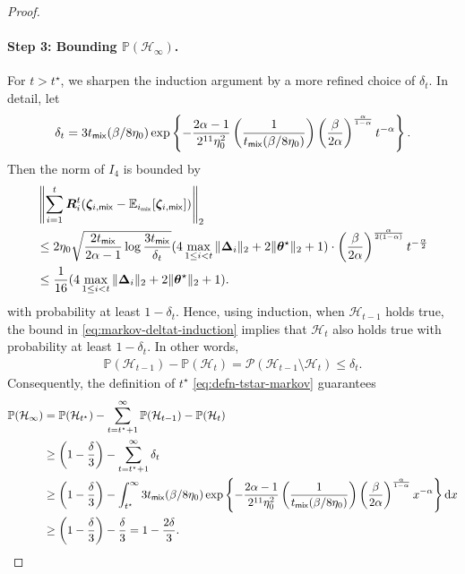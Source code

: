 \begin{proof}
\paragraph{Step 3: Bounding $\mathbb{P}(\mathcal{H}_{\infty})$.} For $t > t^\star$, we sharpen the induction argument by a more refined choice of $\delta_t$. In detail, let 
\begin{align*}
\delta_t = 3t_{\mathsf{mix}}(\beta/8\eta_0)\exp\left\{-\frac{2\alpha-1}{2^{11} \eta_0^2} \left(\frac{1}{t_{\mathsf{mix}}(\beta/8\eta_0)}\right)\left(\frac{\beta}{2\alpha}\right)^{\frac{\alpha}{1-\alpha}} t^{-\alpha}\right\}.
\end{align*}
Then the norm of $I_4$ is bounded by
\begin{align*}
&\left\|\sum_{i=1}^t \bm{R}_i^t (\bm{\zeta}_{i,\mathsf{mix}} - \mathbb{E}_{i_{\mathsf{mix}}}[\bm{\zeta}_{i,\mathsf{mix}}])\right\|_2\\ 
&\leq 2 \eta_0 \sqrt{\frac{2t_{\mathsf{mix}}}{2\alpha-1}\log \frac{3t_{\mathsf{mix}}}{\delta_t}}(4\max_{1 \leq i < t} \|\bm{\Delta}_i\|_2 + 2\|\bm{\theta}^\star\|_2  + 1)\cdot \left(\frac{\beta}{2\alpha}\right)^{\frac{\alpha}{2(1-\alpha)}}t^{-\frac{\alpha}{2}} \\ 
&\leq \frac{1}{16}(4\max_{1 \leq i < t} \|\bm{\Delta}_i\|_2 + 2\|\bm{\theta}^\star\|_2  + 1).
\end{align*}
with probability at least $1-\delta_t$. Hence, using induction, when $\mathcal{H}_{t-1}$ holds true,  the bound in \eqref{eq:markov-deltat-induction} implies that $\mathcal{H}_t$ also holds true with probability at least $1-\delta_t$. In other words,
\begin{align*}
\mathbb{P}(\mathcal{H}_{t-1}) - \mathbb{P}(\mathcal{H}_t) = \mathcal{P}(\mathcal{H}_{t-1} \setminus \mathcal{H}_t) \leq \delta_t.
\end{align*}
Consequently, the definition of $t^\star$ \eqref{eq:defn-tstar-markov} guarantees
\begin{align*}
\mathbb{P}(\mathcal{H}_{\infty}) &= \mathbb{P}(\mathcal{H}_{t^\star}) - \sum_{t=t^\star+1}^{\infty} \mathbb{P}(\mathcal{H}_{t-1}) - \mathbb{P}(\mathcal{H}_t) \\ 
&\geq \left(1-\frac{\delta}{3}\right) - \sum_{t=t^\star+1}^{\infty} \delta_t \\ 
&\geq \left(1-\frac{\delta}{3}\right) - \int_{t^\star}^{\infty} 3t_{\mathsf{mix}}(\beta/8\eta_0)\exp\left\{-\frac{2\alpha-1}{2^{11} \eta_0^2} \left(\frac{1}{t_{\mathsf{mix}}(\beta/8\eta_0)}\right)\left(\frac{\beta}{2\alpha}\right)^{\frac{\alpha}{1-\alpha}} x^{-\alpha}\right\}\mathrm{d}x \\ 
&\geq \left(1-\frac{\delta}{3}\right) - \frac{\delta}{3} = 1-\frac{2\delta}{3}.
\end{align*}

\end{proof}
